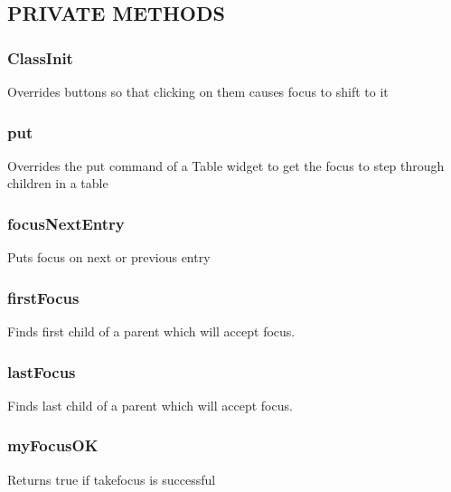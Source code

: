 \documentclass{article}
\begin{document}
\subsection*{PRIVATE METHODS\label{Tk::ViewTable_PRIVATE_METHODS}}
\subsubsection*{ClassInit\label{Tk::ViewTable_ClassInit}}


Overrides buttons so that clicking on them causes focus to shift to it

\subsubsection*{put\label{Tk::ViewTable_put}}


Overrides the put command of a Table widget to get the focus to step through
children in a table

\subsubsection*{focusNextEntry\label{Tk::ViewTable_focusNextEntry}}


Puts focus on next or previous entry

\subsubsection*{firstFocus\label{Tk::ViewTable_firstFocus}}


Finds first child of a parent which will accept focus.

\subsubsection*{lastFocus\label{Tk::ViewTable_lastFocus}}


Finds last child of a parent which will accept focus.

\subsubsection*{myFocusOK\label{Tk::ViewTable_myFocusOK}}


Returns true if takefocus is successful
\end{document}
